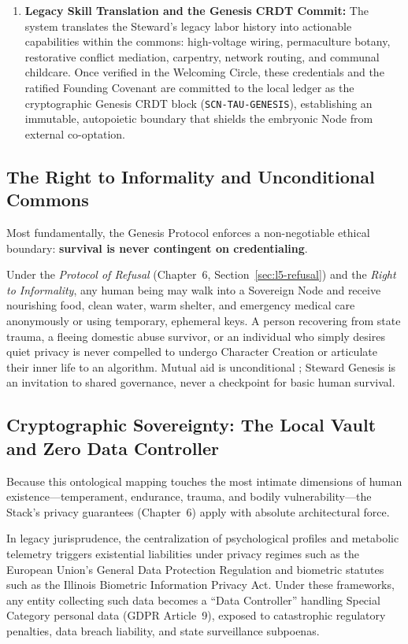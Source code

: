 \begin{enumerate}
    \item \textbf{Legacy Skill Translation and the Genesis CRDT Commit:} The system translates the Steward's legacy labor history into actionable capabilities within the commons: high-voltage wiring, permaculture botany, restorative conflict mediation, carpentry, network routing, and communal childcare. Once verified in the Welcoming Circle, these credentials and the ratified Founding Covenant are committed to the local ledger as the cryptographic Genesis CRDT block (\texttt{SCN-TAU-GENESIS}), establishing an immutable, autopoietic boundary that shields the embryonic Node from external co-optation.
\end{enumerate}

\subsection{The Right to Informality and Unconditional Commons}

Most fundamentally, the Genesis Protocol enforces a non-negotiable ethical boundary: \textbf{survival is never contingent on credentialing}. 

Under the \textit{Protocol of Refusal} (Chapter~6, Section~\ref{sec:l5-refusal}) and the \textit{Right to Informality}, any human being may walk into a Sovereign Node and receive nourishing food, clean water, warm shelter, and emergency medical care anonymously or using temporary, ephemeral keys. A person recovering from state trauma, a fleeing domestic abuse survivor, or an individual who simply desires quiet privacy is never compelled to undergo Character Creation or articulate their inner life to an algorithm. Mutual aid is unconditional \parencite{kropotkin1902}; Steward Genesis is an invitation to shared governance, never a checkpoint for basic human survival.

\subsection{Cryptographic Sovereignty: The Local Vault and Zero Data Controller}

Because this ontological mapping touches the most intimate dimensions of human existence---temperament, endurance, trauma, and bodily vulnerability---the Stack's privacy guarantees (Chapter~6) apply with absolute architectural force. 

In legacy jurisprudence, the centralization of psychological profiles and metabolic telemetry triggers existential liabilities under privacy regimes such as the European Union's General Data Protection Regulation \parencite{gdpr2016} and biometric statutes such as the Illinois Biometric Information Privacy Act. Under these frameworks, any entity collecting such data becomes a ``Data Controller'' handling Special Category personal data (GDPR Article~9), exposed to catastrophic regulatory penalties, data breach liability, and state surveillance subpoenas.

